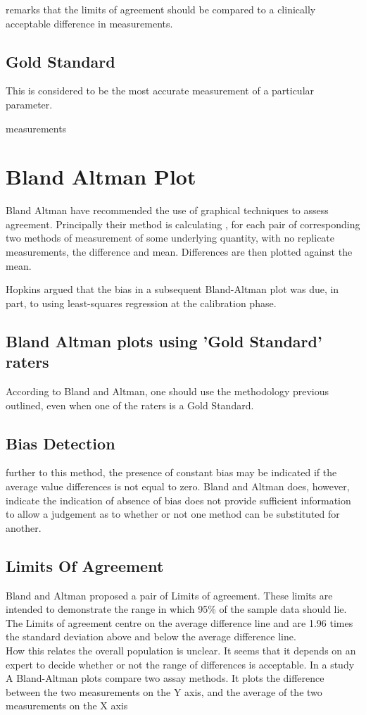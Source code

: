 \documentclass[12pt, a4paper]{report}
\theoremstyle{plain}
\theoremstyle{definition}
\theoremstyle{remark}
\begin{document}
	\citet{Dewitte} remarks that the limits of agreement should be
	compared to a clinically acceptable difference in measurements.
	
	
	\subsection{Gold Standard} This is considered to be the most
	accurate measurement of a particular parameter.
	
	measurements\section{Bland Altman Plot} Bland Altman have
	recommended the use of graphical techniques to assess agreement.
	Principally their method is calculating , for each pair of
	corresponding two methods of measurement of some underlying
	quantity, with no replicate measurements, the difference and mean.
	Differences are then plotted against the mean.
	
	
	Hopkins argued that the bias in a subsequent Bland-Altman plot was
	due, in part, to using least-squares regression at the calibration
	phase.
	
	\subsection{Bland Altman plots using 'Gold Standard' raters}
	According to Bland and Altman, one should use the methodology
	previous outlined, even when one of the raters is a Gold Standard.
	
	
	\subsection{Bias Detection}
	further to this method, the presence of constant bias may be
	indicated if the average value differences is not equal to zero.
	Bland and Altman does, however, indicate the indication of absence
	of bias does not provide sufficient information to allow a
	judgement as to whether or not one method can be substituted for
	another.
	
	
	
	
	\subsection{Limits Of Agreement}
	Bland and Altman proposed a pair of Limits of agreement. These
	limits are intended to demonstrate the range in which 95\% of the
	sample data should lie. The Limits of agreement centre on the
	average difference line and are 1.96 times the standard deviation
	above and below the average difference line.
	\\
	How this relates the overall population is unclear. It seems that
	it depends on an expert to decide whether or not the range of
	differences is acceptable. In a study A Bland-Altman plots compare
	two assay methods. It plots the difference between the two
	measurements on the Y axis, and the average of the two
	measurements on the X axis
	
\end{document}
